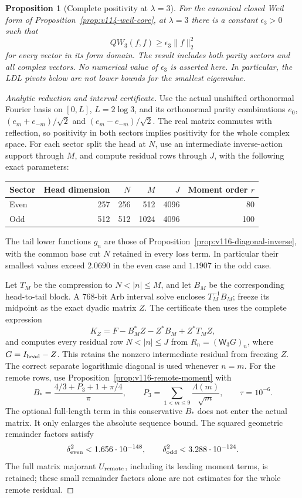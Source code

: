 \documentclass[11pt]{article}
\newtheorem{proposition}[theorem]{Proposition}
\theoremstyle{remark}
\begin{document}
\begin{proposition}[Complete positivity at $\lambda=3$]
\label{prop:v116-window-positive}
For the canonical closed Weil form of
Proposition~\ref{prop:v114-weil-core}, at $\lambda=3$ there is a
constant $\epsilon_3>0$ such that
\[
 QW_3(f,f)\ge\epsilon_3\|f\|_2^2
\]
for every vector in its form domain. The result includes both parity
sectors and all complex vectors. No numerical value of $\epsilon_3$
is asserted here. In particular, the LDL pivots below are not lower
bounds for the smallest eigenvalue.
\end{proposition}
\begin{proof}[Analytic reduction and interval certificate]
Use the actual unshifted orthonormal Fourier basis on $[0,L]$,
$L=2\log3$, and its orthonormal parity combinations
$e_0$, $(e_m+e_{-m})/\sqrt2$ and
$(e_m-e_{-m})/\sqrt2$. The real matrix commutes with reflection, so
positivity in both sectors implies positivity for the whole complex
space. For each sector split the head at $N$, use an intermediate
inverse-action support through $M$, and compute residual rows through
$J$, with the following exact parameters:
\begin{center}
\begin{tabular}{lrrrrr}
\toprule
Sector & Head dimension & $N$ & $M$ & $J$ & Moment order $r$\\
\midrule
Even &257&256&512&4096&80\\
Odd  &512&512&1024&4096&100\\
\bottomrule
\end{tabular}
\end{center}
The tail lower functions $g_n$ are those of
Proposition~\ref{prop:v116-diagonal-inverse}, with the common base cut $N$
retained in every loss term. In particular their smallest values exceed
$2.0690$ in the even case and $1.1907$ in the odd case.

Let $T_M$ be the compression to $N<|n|\le M$, and let $B_M$ be the
corresponding head-to-tail block. A 768-bit Arb interval solve encloses
$T_M^{-1}B_M$; freeze its midpoint as the exact dyadic matrix $Z$.
The certificate then uses the complete expression
\[
 K_Z=F-B_M^*Z-Z^*B_M+Z^*T_MZ,
\]
and computes every residual row $N<|n|\le J$ from
$R_n=(\mathsf W_3G)_n$, where $G=I_{\rm head}-Z$.
This retains the nonzero intermediate residual from freezing $Z$.
The correct separate logarithmic diagonal is used whenever $n=m$.
For the remote rows, use
Proposition~\ref{prop:v116-remote-moment} with
\[
 B_* =\frac{4/3+P_3+1+\pi/4}{\pi},\qquad
 P_3=\sum_{1<m\le9}\frac{\Lambda(m)}{\sqrt m},\qquad
 \tau=10^{-6}.
\]
The optional full-length term in this conservative $B_*$ does not
enter the actual matrix. It only enlarges the absolute sequence bound.
The squared geometric remainder factors satisfy
\[
 \delta^2_{\rm even}<1.656\cdot10^{-148},\qquad
 \delta^2_{\rm odd}<3.288\cdot10^{-124}.
\]
The full matrix majorant $U_{\rm remote}$, including its leading
moment terms, is retained; these small remainder factors alone are not
estimates for the whole remote residual.


\end{proof}
\end{document}
